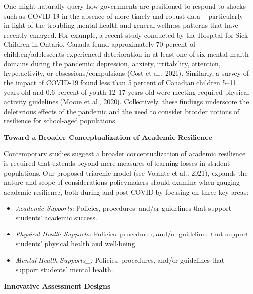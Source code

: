 \documentclass[
]{book}
\providecommand{\tightlist}{%
  \setlength{\itemsep}{0pt}\setlength{\parskip}{0pt}}
\begin{document}
One might naturally query how governments are positioned to respond to shocks such as COVID-19 in the absence of more timely and robust data -- particularly in light of the troubling mental health and general wellness patterns that have recently emerged. For example, a recent study conducted by the Hospital for Sick Children in Ontario, Canada found approximately 70 percent of children/adolescents experienced deterioration in at least one of six mental health domains during the pandemic: depression, anxiety, irritability, attention, hyperactivity, or obsessions/compulsions (Cost et al., 2021). Similarly, a survey of the impact of COVID-19 found less than 5 percent of Canadian children 5--11 years old and 0.6 percent of youth 12--17 years old were meeting required physical activity guidelines (Moore et al., 2020). Collectively, these findings underscore the deleterious effects of the pandemic and the need to consider broader notions of resilience for school-aged populations.

\textbf{Toward a Broader Conceptualization of Academic Resilience}

Contemporary studies suggest a broader conceptualization of academic resilience is required that extends beyond mere measures of learning losses in student populations. Our proposed triarchic model (see Volante et al., 2021), expands the nature and scope of considerations policymakers should examine when gauging academic resilience, both during and post-COVID by focusing on three key areas:

\begin{itemize}
\tightlist
\item
  \emph{Academic Supports:} Policies, procedures, and/or guidelines that support students' academic success.
\item
  \emph{Physical Health Supports:} Policies, procedures, and/or guidelines that support students' physical health and well-being.
\item
  \emph{Mental Health Supports\_:} Policies, procedures, and/or guidelines that support students' mental health.
\end{itemize}

\textbf{Innovative Assessment Designs}
\end{document}
